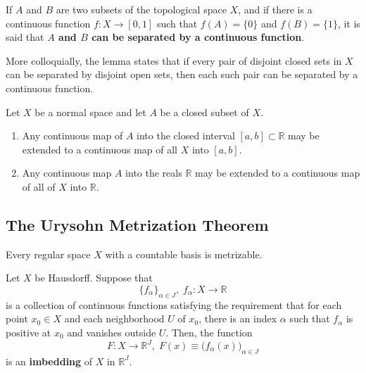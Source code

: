 \documentclass{article}
\begin{document}
    \begin{definition}
    If $A$ and $B$ are two subsets of the topological space $X$, and if there is a continuous function $f: X \longrightarrow [0,1]$ such that $f(A) = \{0\}$ and $f(B) = \{1\}$, it is said that \textbf{$A$ and $B$ can be separated by a continuous function}. 
    \end{definition}

    More colloquially, the lemma states that if every pair of disjoint closed sets in $X$ can be separated by disjoint open sets, then each such pair can be separated by a continuous function. 

    \begin{theorem}
    Let $X$ be a normal space and let $A$ be a closed subset of $X$. 
    \begin{enumerate}
        \item Any continuous map of $A$ into the closed interval $[a,b] \subset \mathbb{R}$ may be extended to a continuous map of all $X$ into $[a,b]$. 
        \item Any continuous map $A$ into the reals $\mathbb{R}$ may be extended to a continuous map of all of $X$ into $\mathbb{R}$. 
    \end{enumerate}
    \end{theorem}

  \subsection{The Urysohn Metrization Theorem}

    \begin{theorem}
    Every regular space $X$ with a countable basis is metrizable. 
    \end{theorem}

    \begin{theorem}
    Let $X$ be Hausdorff. Suppose that 
    \[\{f_\alpha\}_{\alpha \in J}, \; f_\alpha: X \longrightarrow \mathbb{R}\]
    is a collection of continuous functions satisfying the requirement that for each point $x_0 \in X$ and each neighborhood $U$ of $x_0$, there is an index $\alpha$ such that $f_\alpha$ is positive at $x_0$ and vanishes outside $U$. Then, the function 
    \[F: X \longrightarrow \mathbb{R}^J, \; F(x) \equiv \big( f_\alpha (x)\big)_{\alpha \in J}\]
    is an \textbf{imbedding} of $X$ in $\mathbb{R}^J$.
    \end{theorem}
\end{document}
